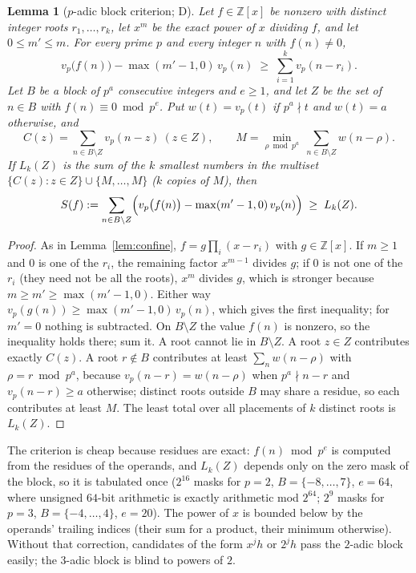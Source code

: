 \documentclass[11pt]{article}
\newtheorem{lemma}[theorem]{Lemma}
\theoremstyle{definition}
\theoremstyle{remark}
\newcommand{\Z}{\mathbb{Z}}
\begin{document}
\begin{lemma}[$p$-adic block criterion; D]\label{lem:padic}
Let $f \in \Z[x]$ be nonzero with distinct integer roots $r_1,\dots,r_k$, let
$x^m$ be the exact power of $x$ dividing $f$, and let $0 \le m' \le m$. For every
prime $p$ and every integer $n$ with $f(n) \ne 0$,
\[
v_p\bigl(f(n)\bigr) - \max(m'-1,0)\,v_p(n) \;\ge\; \sum_{i=1}^{k} v_p(n - r_i).
\]
Let $B$ be a block of $p^a$ consecutive integers and $e \ge 1$, and let $Z$ be the
set of $n \in B$ with $f(n) \equiv 0 \bmod p^e$. Put $w(t) = v_p(t)$ if $p^a \nmid t$
and $w(t) = a$ otherwise, and
\[
C(z) = \sum_{n \in B\setminus Z} v_p(n - z)\ (z \in Z),\qquad
M = \min_{\rho \bmod p^a}\ \sum_{n \in B\setminus Z} w(n-\rho).
\]
If $L_k(Z)$ is the sum of the $k$ smallest numbers in the multiset
$\{C(z) : z \in Z\} \cup \{M,\dots,M\}$ ($k$ copies of $M$), then
\begin{equation}\label{eq:block}
S(f) := \sum_{n \in B\setminus Z}\Bigl(v_p\bigl(f(n)\bigr) - \max(m'-1,0)\,v_p(n)\Bigr) \;\ge\; L_k(Z).
\end{equation}
\end{lemma}
\begin{proof}
As in Lemma~\ref{lem:confine}, $f = g\prod_i(x - r_i)$ with $g \in \Z[x]$. If
$m \ge 1$ and $0$ is one of the $r_i$, the remaining factor $x^{m-1}$ divides $g$; if $0$ is not
one of the $r_i$ (they need not be all the roots), $x^m$ divides $g$, which is stronger because
$m \ge m' \ge \max(m'-1,0)$. Either way $v_p(g(n)) \ge \max(m'-1,0)\,v_p(n)$, which gives the first
inequality; for $m' = 0$ nothing is subtracted. On
$B \setminus Z$ the value $f(n)$ is nonzero, so the inequality holds there; sum it.
A root cannot lie in $B \setminus Z$. A root $z \in Z$ contributes exactly
$C(z)$. A root $r \notin B$ contributes at least $\sum_{n}w(n - \rho)$ with
$\rho = r \bmod p^a$, because $v_p(n - r) = w(n-\rho)$ when $p^a \nmid n-r$ and
$v_p(n-r) \ge a$ otherwise; distinct roots outside $B$ may share a residue, so each
contributes at least $M$. The least total over all placements of $k$ distinct roots
is $L_k(Z)$.
\end{proof}

The criterion is cheap because residues are exact: $f(n) \bmod p^e$ is computed
from the residues of the operands, and $L_k(Z)$ depends only on the zero mask of
the block, so it is tabulated once ($2^{16}$ masks for $p = 2$, $B = \{-8,\dots,7\}$,
$e = 64$, where unsigned $64$-bit arithmetic is exactly arithmetic mod $2^{64}$;
$2^9$ masks for $p = 3$, $B = \{-4,\dots,4\}$, $e = 20$). The power of $x$ is
bounded below by the operands' trailing indices (their sum for a product, their
minimum otherwise). Without that correction, candidates of the form $x^j h$ or
$2^j h$ pass the $2$-adic block easily; the $3$-adic block is blind to powers of
$2$.
\end{document}
